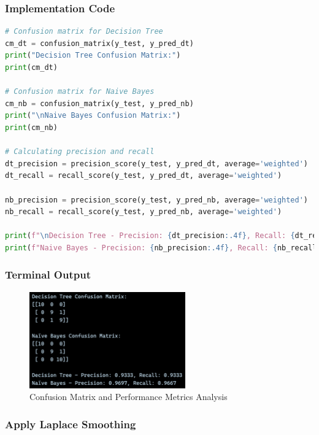 \documentclass[12pt,a4paper]{article}
\begin{document}
\newpage
\subsubsection{Implementation Code}
\begin{lstlisting}[language=Python, caption=Analyze Confusion Matrix Precision Recall]
# Confusion matrix for Decision Tree
cm_dt = confusion_matrix(y_test, y_pred_dt)
print("Decision Tree Confusion Matrix:")
print(cm_dt)

# Confusion matrix for Naive Bayes
cm_nb = confusion_matrix(y_test, y_pred_nb)
print("\nNaive Bayes Confusion Matrix:")
print(cm_nb)

# Calculating precision and recall
dt_precision = precision_score(y_test, y_pred_dt, average='weighted')
dt_recall = recall_score(y_test, y_pred_dt, average='weighted')

nb_precision = precision_score(y_test, y_pred_nb, average='weighted')
nb_recall = recall_score(y_test, y_pred_nb, average='weighted')

print(f"\nDecision Tree - Precision: {dt_precision:.4f}, Recall: {dt_recall:.4f}")
print(f"Naive Bayes - Precision: {nb_precision:.4f}, Recall: {nb_recall:.4f}")
\end{lstlisting}

\subsubsection{Terminal Output}

\begin{figure}[h!]
    \centering
    \includegraphics[width=0.6\textwidth]{Figures/cfmatrix.png}
    \caption{Confusion Matrix and Performance Metrics Analysis}
\end{figure}

\newpage
\subsubsection{Apply Laplace Smoothing}
\end{document}
